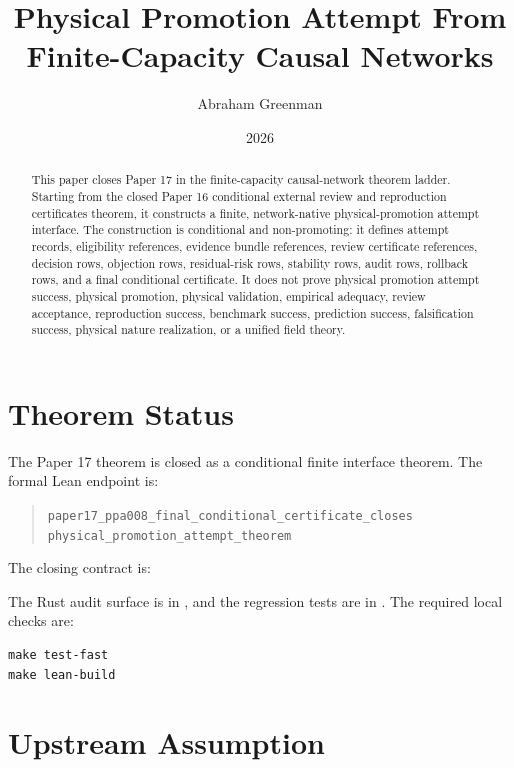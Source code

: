 \documentclass{article}
\title{Physical Promotion Attempt From Finite-Capacity Causal Networks}
\author{Abraham Greenman}
\date{2026}
\begin{document}
\maketitle

\begin{abstract}
This paper closes Paper 17 in the finite-capacity causal-network theorem
ladder. Starting from the closed Paper 16 conditional external review and
reproduction certificates theorem, it constructs a finite, network-native
physical-promotion attempt interface. The construction is conditional and
non-promoting: it defines attempt records, eligibility references, evidence
bundle references, review certificate references, decision rows, objection
rows, residual-risk rows, stability rows, audit rows, rollback rows, and a
final conditional certificate. It does not prove physical promotion attempt
success, physical promotion, physical validation, empirical adequacy, review
acceptance, reproduction success, benchmark success, prediction success,
falsification success, physical nature realization, or a unified field theory.
\end{abstract}

\section{Theorem Status}

The Paper 17 theorem is closed as a conditional finite interface theorem. The
formal Lean endpoint is:
\begin{quote}
\texttt{paper17\_ppa008\_final\_conditional\_certificate\_closes}\\
\texttt{physical\_promotion\_attempt\_theorem}
\end{quote}
The closing contract is:
\begin{quote}
\end{quote}

The Rust audit surface is in , and the
regression tests are in
. The
required local checks are:
\begin{verbatim}
make test-fast
make lean-build
\end{verbatim}

\section{Upstream Assumption}
\end{document}
